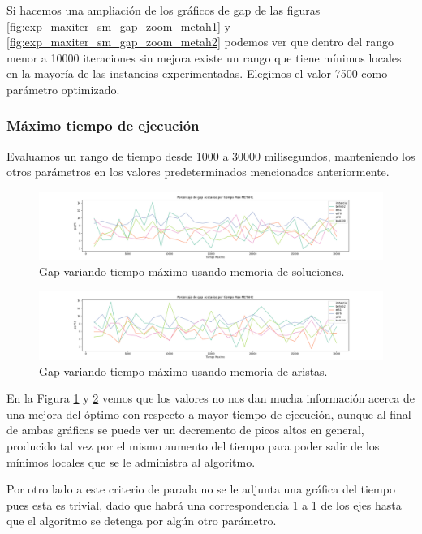 \documentclass[10pt,a4paper]{article}
\begin{document}
Si hacemos una ampliación de los gráficos de gap de las figuras \ref{fig:exp_maxiter_sm_gap_zoom_metah1} y \ref{fig:exp_maxiter_sm_gap_zoom_metah2} podemos ver que dentro del rango menor a 10000 iteraciones sin mejora existe un rango que tiene mínimos locales en la mayoría de las instancias experimentadas. Elegimos el valor 7500 como parámetro optimizado.

\subsubsection{Máximo tiempo de ejecución}
Evaluamos un rango de tiempo desde 1000 a 30000 milisegundos, manteniendo los otros parámetros en los valores predeterminados mencionados anteriormente.

\begin{figure}[h!]
    \centering
    \includegraphics[scale=0.3]{Graphs-metaH/maxtime-gap-METAH1}
    \caption{Gap variando tiempo máximo usando memoria de soluciones.}
    \label{fig:exp_maxtime_gap_metah1}
\end{figure}

\begin{figure}[h!]
    \centering
    \includegraphics[scale=0.3]{Graphs-metaH/maxtime-gap-METAH2}
    \caption{Gap variando tiempo máximo usando memoria de aristas.}
    \label{fig:exp_maxtime_gap_metah2}
\end{figure}

En la Figura \ref{fig:exp_maxtime_gap_metah1} y \ref{fig:exp_maxtime_gap_metah2} vemos que los valores no nos dan mucha información acerca de una mejora del óptimo con respecto a mayor tiempo de ejecución, aunque al final de ambas gráficas se puede ver un decremento de picos altos en general, producido tal vez por el mismo aumento del tiempo para poder salir de los mínimos locales que se le administra al algoritmo.

Por otro lado a este criterio de parada no se le adjunta una gráfica del tiempo pues esta es trivial, dado que habrá una correspondencia 1 a 1 de los ejes hasta que el algoritmo se detenga por algún otro parámetro.
\end{document}
